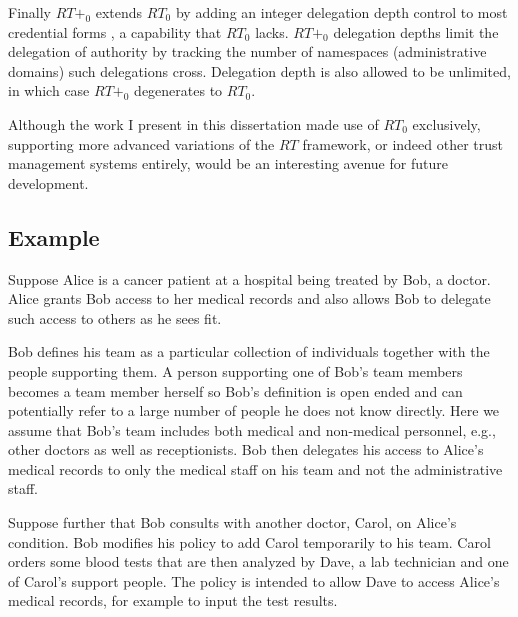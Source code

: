 Finally $RT+_0$ extends $RT_0$ by adding an integer delegation depth control to most
credential forms \cite{Hong:DDCTMS}, a capability that $RT_0$ lacks. $RT+_0$ delegation depths
limit the delegation of authority by tracking the number of namespaces (administrative domains)
such delegations cross. Delegation depth is also allowed to be unlimited, in which case $RT+_0$
degenerates to $RT_0$.

Although the work I present in this dissertation made use of $RT_0$ exclusively, supporting more
advanced variations of the $RT$ framework, or indeed other trust management systems entirely,
would be an interesting avenue for future development.

\subsection{Example}

Suppose Alice is a cancer patient at a hospital being treated by Bob, a doctor. Alice grants Bob
access to her medical records and also allows Bob to delegate such access to others as he sees
fit.

Bob defines his team as a particular collection of individuals together with the people
supporting them. A person supporting one of Bob's team members becomes a team member herself so
Bob's definition is open ended and can potentially refer to a large number of people he does not
know directly. Here we assume that Bob's team includes both medical and non-medical personnel,
e.g., other doctors as well as receptionists. Bob then delegates his access to Alice's medical
records to only the medical staff on his team and not the administrative staff.

Suppose further that Bob consults with another doctor, Carol, on Alice's condition. Bob modifies
his policy to add Carol temporarily to his team. Carol orders some blood tests that are then
analyzed by Dave, a lab technician and one of Carol's support people. The policy is intended to
allow Dave to access Alice's medical records, for example to input the test results.

